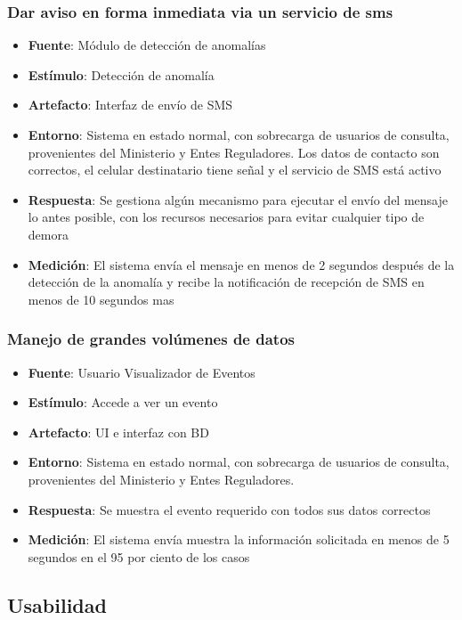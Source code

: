 \subsubsection{Dar aviso en forma inmediata via un servicio de sms}
\begin{itemize}
\item {\bf Fuente}: Módulo de detección de anomalías
\item {\bf Estímulo}: Detección de anomalía
\item {\bf Artefacto}: Interfaz de envío de SMS
\item {\bf Entorno}: Sistema en estado normal, con sobrecarga de usuarios de consulta, provenientes del Ministerio y Entes Reguladores. Los datos de contacto son correctos, el celular destinatario tiene señal y el servicio de SMS está activo
\item {\bf Respuesta}: Se gestiona algún mecanismo para ejecutar el envío del mensaje lo antes posible, con los recursos necesarios para evitar cualquier tipo de demora
\item {\bf Medición}: El sistema envía el mensaje en menos de 2 segundos después de la detección de la anomalía y recibe la notificación de recepción de SMS en menos de 10 segundos mas 
\end{itemize}

\subsubsection{Manejo de grandes volúmenes de datos}
\begin{itemize}
\item {\bf Fuente}: Usuario Visualizador de Eventos
\item {\bf Estímulo}: Accede a ver un evento
\item {\bf Artefacto}: UI e interfaz con BD
\item {\bf Entorno}: Sistema en estado normal, con sobrecarga de usuarios de consulta, provenientes del Ministerio y Entes Reguladores.
\item {\bf Respuesta}: Se muestra el evento requerido con todos sus datos correctos
\item {\bf Medición}: El sistema envía muestra la información solicitada en menos de 5 segundos en el 95 por ciento de los casos
\end{itemize}

\subsection{Usabilidad}

